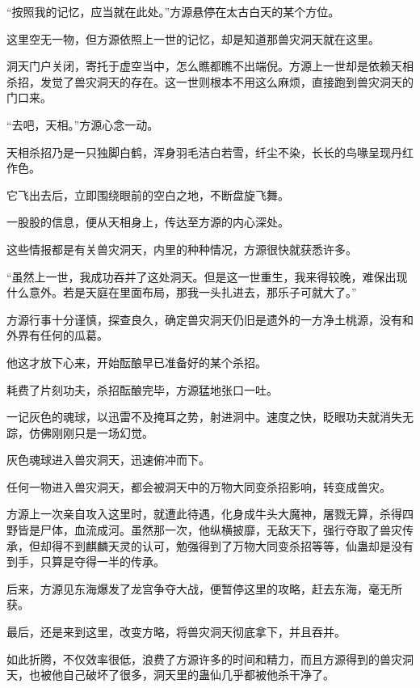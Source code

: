 
\begin{this_body}

“按照我的记忆，应当就在此处。”方源悬停在太古白天的某个方位。

这里空无一物，但方源依照上一世的记忆，却是知道那兽灾洞天就在这里。

洞天门户关闭，寄托于虚空当中，怎么瞧都瞧不出端倪。方源上一世却是依赖天相杀招，发觉了兽灾洞天的存在。这一世则根本不用这么麻烦，直接跑到兽灾洞天的门口来。

“去吧，天相。”方源心念一动。

天相杀招乃是一只独脚白鹤，浑身羽毛洁白若雪，纤尘不染，长长的鸟喙呈现丹红作色。

它飞出去后，立即围绕眼前的空白之地，不断盘旋飞舞。

一股股的信息，便从天相身上，传达至方源的内心深处。

这些情报都是有关兽灾洞天，内里的种种情况，方源很快就获悉许多。

“虽然上一世，我成功吞并了这处洞天。但是这一世重生，我来得较晚，难保出现什么意外。若是天庭在里面布局，那我一头扎进去，那乐子可就大了。”

方源行事十分谨慎，探查良久，确定兽灾洞天仍旧是遗外的一方净土桃源，没有和外界有任何的瓜葛。

他这才放下心来，开始酝酿早已准备好的某个杀招。

耗费了片刻功夫，杀招酝酿完毕，方源猛地张口一吐。

一记灰色的魂球，以迅雷不及掩耳之势，射进洞中。速度之快，眨眼功夫就消失无踪，仿佛刚刚只是一场幻觉。

灰色魂球进入兽灾洞天，迅速俯冲而下。

任何一物进入兽灾洞天，都会被洞天中的万物大同变杀招影响，转变成兽灾。

方源上一次亲自攻入这里时，就遭此待遇，化身成牛头大魔神，屠戮无算，杀得四野皆是尸体，血流成河。虽然那一次，他纵横披靡，无敌天下，强行夺取了兽灾传承，但却得不到麒麟天灵的认可，勉强得到了万物大同变杀招等等，仙蛊却是没有到手，只算是夺得一半的传承。

后来，方源见东海爆发了龙宫争夺大战，便暂停这里的攻略，赶去东海，毫无所获。

最后，还是来到这里，改变方略，将兽灾洞天彻底拿下，并且吞并。

如此折腾，不仅效率很低，浪费了方源许多的时间和精力，而且方源得到的兽灾洞天，也被他自己破坏了很多，洞天里的蛊仙几乎都被他杀干净了。


\end{this_body}
